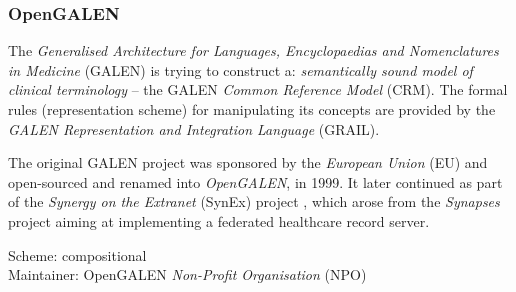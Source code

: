 %
%
%
%
%
%
%

\subsubsection{OpenGALEN}
\label{open_galen_heading}

The \emph{Generalised Architecture for Languages, Encyclopaedias and
Nomenclatures in Medicine} (GALEN) is trying to construct a:
\textit{semantically sound model of clinical terminology} -- the GALEN
\emph{Common Reference Model} (CRM). The formal rules (representation scheme)
for manipulating its concepts are provided by the \emph{GALEN Representation
and Integration Language} (GRAIL).

The original GALEN project was sponsored by the \emph{European Union} (EU) and
open-sourced and renamed into \emph{OpenGALEN}, in 1999. It later continued as
part of the \emph{Synergy on the Extranet} (SynEx) project \cite{synex}, which
arose from the \emph{Synapses} project aiming at implementing a federated
healthcare record server.

Scheme: compositional\\
Maintainer: OpenGALEN \emph{Non-Profit Organisation} (NPO)
